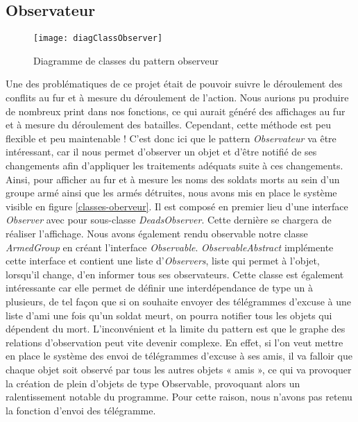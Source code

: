 \subsection{Observateur}
\begin{figure}[h]
\begin{center}
    \texttt{[image: diagClassObserver]}
\end{center}
    \caption{Diagramme de classes du pattern observeur}
    \label{classes-oberveur}
\end{figure}

Une des problématiques de ce projet était de pouvoir suivre le déroulement des conflits au fur et à mesure du déroulement de l’action. Nous aurions pu produire de nombreux print dans nos fonctions, ce qui aurait généré des affichages au fur et à mesure du déroulement des batailles. Cependant, cette méthode est peu flexible et peu maintenable ! 
C'est donc ici que le pattern \emph{Observateur} va être intéressant, car il nous permet d'observer un objet et d'être notifié de ses changements afin d'appliquer les traitements adéquats suite à ces changements. 
Ainsi, pour afficher au fur et à mesure les noms des soldats morts au sein d'un groupe armé ainsi que les armés détruites, nous avons mis en place le système visible en figure \vref{classes-oberveur}. Il est composé en premier lieu d'une interface \emph{Observer} avec pour sous-classe \emph{DeadsObserver}. Cette dernière se chargera de réaliser l'affichage. Nous avons également rendu observable notre classe \emph{ArmedGroup} en créant l'interface \emph{Observable}. \emph{ObservableAbstract} implémente cette interface et contient une liste d'\emph{Observers}, liste qui permet à l'objet, lorsqu'il change, d'en informer tous ses observateurs. 
Cette classe est également intéressante car elle permet de définir une interdépendance de type un à plusieurs, de tel façon que si on souhaite envoyer des télégrammes d’excuse à une liste d'ami une fois qu'un soldat meurt, on pourra notifier tous les objets qui dépendent du mort. L'inconvénient et la limite du pattern est que le graphe des relations d'observation peut vite devenir complexe. En effet, si l'on veut mettre en place le système des envoi de télégrammes d’excuse à ses amis, il va falloir que chaque objet soit observé par tous les autres objets « amis », ce qui va provoquer la création de plein d'objets de type Observable, provoquant alors un ralentissement notable du programme. Pour cette raison, nous n'avons pas retenu la fonction d'envoi des télégramme.